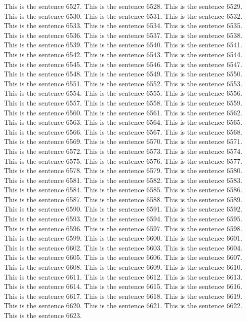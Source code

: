 \documentclass{article}
\begin{document}
This is the sentence 6527.
This is the sentence 6528.
This is the sentence 6529.
This is the sentence 6530.
This is the sentence 6531.
This is the sentence 6532.
This is the sentence 6533.
This is the sentence 6534.
This is the sentence 6535.
This is the sentence 6536.
This is the sentence 6537.
This is the sentence 6538.
This is the sentence 6539.
This is the sentence 6540.
This is the sentence 6541.
This is the sentence 6542.
This is the sentence 6543.
This is the sentence 6544.
This is the sentence 6545.
This is the sentence 6546.
This is the sentence 6547.
This is the sentence 6548.
This is the sentence 6549.
This is the sentence 6550.
This is the sentence 6551.
This is the sentence 6552.
This is the sentence 6553.
This is the sentence 6554.
This is the sentence 6555.
This is the sentence 6556.
This is the sentence 6557.
This is the sentence 6558.
This is the sentence 6559.
This is the sentence 6560.
This is the sentence 6561.
This is the sentence 6562.
This is the sentence 6563.
This is the sentence 6564.
This is the sentence 6565.
This is the sentence 6566.
This is the sentence 6567.
This is the sentence 6568.
This is the sentence 6569.
This is the sentence 6570.
This is the sentence 6571.
This is the sentence 6572.
This is the sentence 6573.
This is the sentence 6574.
This is the sentence 6575.
This is the sentence 6576.
This is the sentence 6577.
This is the sentence 6578.
This is the sentence 6579.
This is the sentence 6580.
This is the sentence 6581.
This is the sentence 6582.
This is the sentence 6583.
This is the sentence 6584.
This is the sentence 6585.
This is the sentence 6586.
This is the sentence 6587.
This is the sentence 6588.
This is the sentence 6589.
This is the sentence 6590.
This is the sentence 6591.
This is the sentence 6592.
This is the sentence 6593.
This is the sentence 6594.
This is the sentence 6595.
This is the sentence 6596.
This is the sentence 6597.
This is the sentence 6598.
This is the sentence 6599.
This is the sentence 6600.
This is the sentence 6601.
This is the sentence 6602.
This is the sentence 6603.
This is the sentence 6604.
This is the sentence 6605.
This is the sentence 6606.
This is the sentence 6607.
This is the sentence 6608.
This is the sentence 6609.
This is the sentence 6610.
This is the sentence 6611.
This is the sentence 6612.
This is the sentence 6613.
This is the sentence 6614.
This is the sentence 6615.
This is the sentence 6616.
This is the sentence 6617.
This is the sentence 6618.
This is the sentence 6619.
This is the sentence 6620.
This is the sentence 6621.
This is the sentence 6622.
This is the sentence 6623.
\end{document}
